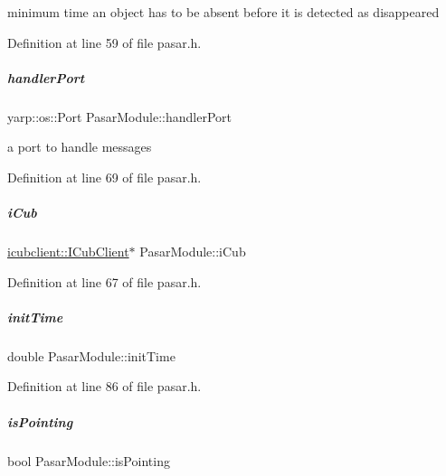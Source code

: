 minimum time an object has to be absent before it is detected as disappeared 



Definition at line 59 of file pasar.\+h.

\mbox{\label{group__pasar_ab8c417213c0beb8e580d8fb2b1eebb66}} 
\subparagraph{\texorpdfstring{handler\+Port}{handlerPort}}
{\footnotesize\ttfamily yarp\+::os\+::\+Port Pasar\+Module\+::handler\+Port\hspace{0.3cm}{\ttfamily [protected]}}



a port to handle messages 



Definition at line 69 of file pasar.\+h.

\mbox{\label{group__pasar_a3f1698bbf327cebc9f30354b552abfaf}} 
\subparagraph{\texorpdfstring{i\+Cub}{iCub}}
{\footnotesize\ttfamily \hyperlink{group__icubclient__clients_classicubclient_1_1ICubClient}{icubclient\+::\+I\+Cub\+Client}$\ast$ Pasar\+Module\+::i\+Cub\hspace{0.3cm}{\ttfamily [protected]}}



Definition at line 67 of file pasar.\+h.

\mbox{\label{group__pasar_a35ffec49eb190ac39eab3ea3934b34f4}} 
\subparagraph{\texorpdfstring{init\+Time}{initTime}}
{\footnotesize\ttfamily double Pasar\+Module\+::init\+Time\hspace{0.3cm}{\ttfamily [protected]}}



Definition at line 86 of file pasar.\+h.

\mbox{\label{group__pasar_a76569b77bf2b4b9fa8782651660a9d2f}} 
\subparagraph{\texorpdfstring{is\+Pointing}{isPointing}}
{\footnotesize\ttfamily bool Pasar\+Module\+::is\+Pointing\hspace{0.3cm}{\ttfamily [protected]}}



